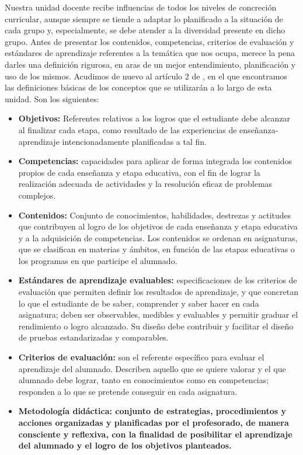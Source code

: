 \documentclass[../main.tex]{book}
\begin{document}
Nuestra unidad docente recibe influencias de todos los niveles de concreción curricular, aunque siempre se tiende a adaptar lo planificado a la situación de cada grupo y, especialmente, se debe atender a la diversidad presente en dicho grupo. Antes de presentar los contenidos, competencias, criterios de evaluación y estándares de aprendizaje referentes a la temática que nos ocupa, merece la pena darles una definición rigurosa, en aras de un mejor entendimiento, planificación y uso de los mismos. Acudimos de nuevo al artículo 2 de \cite{RD1105}, en el que encontramos las definiciones básicas de los conceptos que se utilizarán a lo largo de esta unidad. Son los siguientes:

\begin{itemize}
	\item \textbf{Objetivos: } Referentes relativos a los logros que el estudiante debe alcanzar al finalizar cada etapa, como resultado de las experiencias de enseñanza-aprendizaje intencionadamente planificadas a tal fin.
	\item \textbf{Competencias: } capacidades para aplicar de forma integrada los contenidos propios de cada enseñanza y etapa educativa, con el fin de lograr la realización adecuada de actividades y la resolución eficaz de problemas complejos.
	\item \textbf{Contenidos: } Conjunto de conocimientos, habilidades, destrezas y actitudes que contribuyen al logro de los objetivos de cada enseñanza y etapa educativa y  a la adquisición de competencias. Los contenidos se ordenan en asignaturas, que se clasifican en materias y ámbitos, en función de las etapas educativas o los programas en que participe el alumnado.
	\item \textbf{Estándares de aprendizaje evaluables: } especificaciones de los criterios de evaluación que permiten definir los resultados de aprendizaje, y que concretan lo que el estudiante de be saber, comprender y saber hacer en cada asignatura; deben ser observables, medibles y evaluables y permitir graduar el rendimiento o logro alcanzado. Su diseño debe contribuir y facilitar el diseño de pruebas estandarizadas y comparables.
	\item \textbf{Criterios de evaluación: } son el referente específico para evaluar el aprendizaje del alumnado. Describen aquello que se quiere valorar y el que alumnado debe lograr, tanto en conocimientos como en competencias; responden a lo que se pretende conseguir en cada asignatura.
	\item \textbf{Metodología didáctica: conjunto de estrategias, procedimientos y acciones organizadas y planificadas por el profesorado, de manera consciente y reflexiva, con la finalidad de posibilitar el aprendizaje del alumnado y el logro de los objetivos planteados.}
\end{itemize} 
\end{document}
